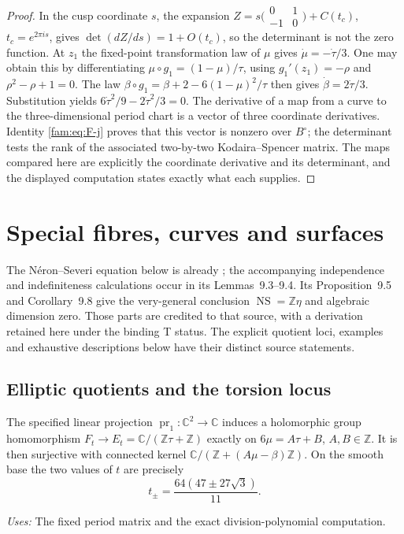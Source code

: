 \begin{proof}
In the cusp coordinate $s$, the expansion
$Z=s\bigl(\begin{smallmatrix}0&1\\-1&0\end{smallmatrix}\bigr)+C(t_c)$,
$t_c=e^{2\pi is}$, gives
$\det(dZ/ds)=1+O(t_c)$, so the determinant is not the zero function.
At $z_1$ the fixed-point transformation law of $\mu$ gives
$\dot\mu=-\dot\tau/3$.  One may obtain this by differentiating
$\mu\circ g_1=(1-\mu)/\tau$, using
$g_1'(z_1)=-\rho$ and $\rho^2-\rho+1=0$.
The law
$\beta\circ g_1=\beta+2-6(1-\mu)^2/\tau$ then gives
$\dot\beta=2\dot\tau/3$.  Substitution yields
$6\dot\tau^2/9-2\dot\tau^2/3=0$.
The derivative of a map from a curve to the three-dimensional period
chart is a vector of three coordinate derivatives.  Identity
\eqref{fam:eq:F-j} proves that this vector is nonzero over $B^\circ$;
the determinant tests the rank of the associated two-by-two
Kodaira--Spencer matrix.  The maps compared here are explicitly the
coordinate derivative and its determinant, and the displayed computation
states exactly what each supplies.
\end{proof}

\section{Special fibres, curves and surfaces}
\label{sec:fibres}
The N\'eron--Severi equation below is already
\cite[\S9.1, Lemma~9.2]{AC26}; the accompanying independence and
indefiniteness calculations occur in its Lemmas~9.3--9.4. Its
Proposition~9.5 and Corollary~9.8 give the very-general conclusion
$\operatorname{NS}=\mathbb Z\eta$ and algebraic dimension zero.
Those parts are credited to that source, with a derivation retained here
under the binding T status. The explicit quotient loci, examples and
exhaustive descriptions below have their distinct source statements.
\subsection{Elliptic quotients and the torsion locus}
\begin{proposition}[FAM D.1.1; T]\label{fam:D.1.1}
The specified linear projection \(\operatorname{pr}_1:\mathbb C^2\to
\mathbb C\) induces a holomorphic group homomorphism
\(F_t\to E_t=\mathbb C/(\mathbb Z\tau+\mathbb Z)\) exactly on
\(6\mu=A\tau+B\), \(A,B\in\mathbb Z\). It is then surjective with
connected kernel
\(\mathbb C/(\mathbb Z+(A\mu-\beta)\mathbb Z)\).
On the smooth base the two values of \(t\) are precisely
\[
 t_\pm=\frac{64(47\pm27\sqrt3)}{11}.
\]
\end{proposition}
\noindent\emph{Uses:} The fixed period matrix and the exact division-polynomial computation.\par


